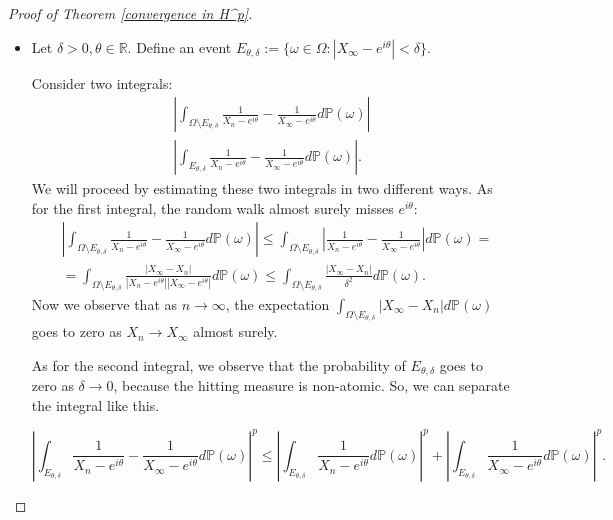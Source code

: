 \documentclass[11pt]{article}
\begin{document}
\begin{proof}[Proof of Theorem \ref{convergence in H^p}]
	\indent
	\begin{itemize}
		\item 
		
		Let $\delta > 0, \theta \in \mathbb{R}$. Define an event $E_{\theta, \delta} := \{ \omega \in \Omega : |X_\infty - e^{i \theta}| < \delta \}$.
		
		Consider two integrals:
		\begin{gather}
			\left| \int_{\Omega \setminus E_{\theta, \delta}} \frac{1}{X_n - e^{i \theta}} - \frac{1}{X_\infty - e^{i \theta}} d \mathbb{P}(\omega) \right| \\
			\left| \int_{E_{\theta, \delta}} \frac{1}{X_n - e^{i \theta}} - \frac{1}{X_\infty - e^{i \theta}} d \mathbb{P}(\omega) \right|.
		\end{gather}
		We will proceed by estimating these two integrals in two different ways. As for the first integral, the random walk almost surely misses $e^{i \theta}$:
		\[
		\begin{aligned}
			& \left| \int_{\Omega \setminus E_{\theta, \delta}} \frac{1}{X_n - e^{i \theta}} - \frac{1}{X_\infty - e^{i \theta}} d \mathbb{P}(\omega) \right| \le
			\int_{\Omega \setminus E_{\theta, \delta}} \left| \frac{1}{X_n - e^{i \theta}} - \frac{1}{X_\infty - e^{i \theta}} \right| d \mathbb{P}(\omega) = \\ 
			& = \int_{\Omega \setminus E_{\theta, \delta}} \frac{|X_\infty - X_n|}{|X_n - e^{i \theta}| |X_\infty - e^{i \theta}|} d \mathbb{P}(\omega) \le \int_{\Omega \setminus E_{\theta, \delta}} \frac{|X_\infty - X_n|}{\delta^2} d \mathbb{P}(\omega).
		\end{aligned}
		\]
		Now we observe that as $n \rightarrow \infty$, the expectation $\int_{\Omega \setminus E_{\theta, \delta}} |X_\infty - X_n| d \mathbb{P}(\omega)$ goes to zero as $X_n \rightarrow X_\infty$ almost surely.
		
		As for the second integral, we observe that the probability of $E_{\theta, \delta}$ goes to zero as $\delta \rightarrow 0$, because the hitting measure is non-atomic. So, we can separate the integral like this.
		
		\[
		\left| \int_{E_{\theta, \delta}} \frac{1}{X_n - e^{i \theta}} - \frac{1}{X_\infty - e^{i \theta}} d \mathbb{P}(\omega) \right|^p \le \left| \int_{E_{\theta, \delta}} \frac{1}{X_n - e^{i \theta}} d \mathbb{P}(\omega) \right|^p + \left| \int_{E_{\theta, \delta}} \frac{1}{X_\infty - e^{i \theta}} d \mathbb{P}(\omega) \right|^p .
		\]
		

\end{itemize}
\end{proof}
\end{document}
